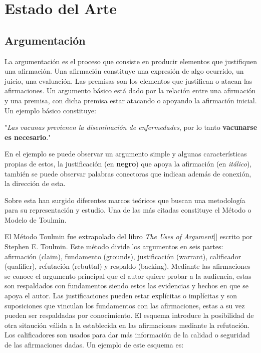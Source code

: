 \chapter{Estado del Arte}\label{chapter:state-of-the-art}


\section{Argumentación}

La argumentación es el proceso que consiste en producir elementos que justifiquen una afirmación. Una afirmación 
constituye una expresión de algo ocurrido, un juicio, una evaluación. Las premisas son los elementos que 
justifican o atacan las afirmaciones. Un argumento básico está dado por la relación entre una afirmación y una 
premisa, con dicha premisa estar atacando o apoyando la afirmación inicial. Un ejemplo básico constituye:

"\emph{Las vacunas previenen la diseminación de enfermedades}, por lo tanto \textbf{vacunarse es necesario}."

En el ejemplo se puede observar un argumento simple y algunas características propias de estos, la justificación 
(en \textbf{negro}) que apoya la afirmación (en \emph{itálico}), también se puede observar palabras conectoras 
que indican además de conexión, la dirección de esta.

Sobre esta han surgido diferentes marcos teóricos que buscan una metodología para su representación y estudio. 
Una de las más citadas constituye el Método o Modelo de Toulmin.

El Método Toulmin fue extrapolado del libro \emph{The Uses of Argument}[\cite{toulmin_2003}] escrito por Stephen E. Toulmin.
Este método divide los argumentos en seis partes: afirmación (claim), fundamento (grounds), 
justificación (warrant), calificador (qualifier), refutación (rebuttal) y respaldo (backing).
Mediante las afirmaciones se conoce el argumento principal que el autor quiere probar a la audiencia,
estas son respaldados con fundamentos siendo estos las evidencias y hechos en que se apoya el autor.
Las justificaciones pueden estar explícitas o implícitas y son suposiciones que vinculan los
fundamentos con las afirmaciones, estas a su vez pueden ser respaldadas por conocimiento.
El esquema introduce la posibilidad de otra sitaución válida a la establecida en las afirmaciones
mediante la refutación. Los calificadores son usados para dar más información de la calidad o seguridad
de las afirmaciones dadas. Un ejemplo de este esquema es:

